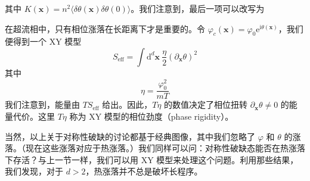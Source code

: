
其中 $K(\pmb{x}) = n^{2}\langle \delta\theta(\pmb{x})\delta\theta(0)\rangle$。我们注意到，最后一项可以改写为

在超流相中，只有相位涨落在长距离下才是重要的。令 $\varphi_c(\pmb{x}) = \varphi_0\mathrm{e}^{\mathrm{i}\theta(\pmb{x})}$，我们便得到一个 XY 模型
\begin{equation*}
S_{\mathrm{eff}} = \int \mathrm{d}^{d}\pmb{x}\ \frac{\eta}{2}(\partial_{\pmb{x}}\theta)^{2}
\tag{3.4.2}
\end{equation*}
其中
\begin{equation*}
\eta = \frac{\varphi_{0}^{2}}{mT}
\tag{3.4.3}
\end{equation*}
我们注意到，能量由 $TS_{\mathrm{eff}}$ 给出。因此，$T\eta$ 的数值决定了相位扭转 $\partial_{\pmb{x}}\theta \neq 0$ 的能量代价。这里 $T\eta$ 称为 XY 模型的相位劲度（phase rigidity）。

当然，以上关于对称性破缺的讨论都基于经典图像，其中我们忽略了 $\varphi$ 和 $\theta$ 的涨落。（现在这些涨落对应于热涨落。）我们同样可以问：对称性破缺态能否在热涨落下存活？与上一节一样，我们可以用 XY 模型来处理这个问题。利用那些结果，我们发现，对于 $d>2$，热涨落并不总是破坏长程序。

